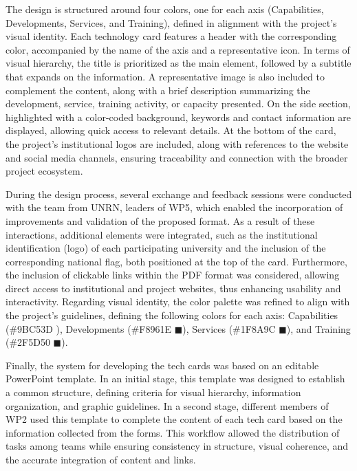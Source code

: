\documentclass[
  12pt,
  oneside]{book}
\begin{document}
The design is structured around four colors, one for each axis
(Capabilities, Developments, Services, and Training), defined in
alignment with the project's visual identity. Each technology card
features a header with the corresponding color, accompanied by the name
of the axis and a representative icon. In terms of visual hierarchy, the
title is prioritized as the main element, followed by a subtitle that
expands on the information. A representative image is also included to
complement the content, along with a brief description summarizing the
development, service, training activity, or capacity presented. On the
side section, highlighted with a color-coded background, keywords and
contact information are displayed, allowing quick access to relevant
details. At the bottom of the card, the project's institutional logos
are included, along with references to the website and social media
channels, ensuring traceability and connection with the broader project
ecosystem.

During the design process, several exchange and feedback sessions were
conducted with the team from UNRN, leaders of WP5, which enabled the
incorporation of improvements and validation of the proposed format. As
a result of these interactions, additional elements were integrated,
such as the institutional identification (logo) of each participating
university and the inclusion of the corresponding national flag, both
positioned at the top of the card. Furthermore, the inclusion of
clickable links within the PDF format was considered, allowing direct
access to institutional and project websites, thus enhancing usability
and interactivity. Regarding visual identity, the color palette was
refined to align with the project's guidelines, defining the following
colors for each axis: Capabilities (\#9BC53D
\textcolor{Verde}{\scalebox{1}{$\blacksquare$}}), Developments (\#F8961E
\textcolor{Naranja}{$\blacksquare$}), Services (\#1F8A9C
\textcolor{Celeste}{$\blacksquare$}), and Training (\#2F5D50
\textcolor{Verde_osc}{$\blacksquare$}).

Finally, the system for developing the tech cards was based on an
editable PowerPoint template. In an initial stage, this template was
designed to establish a common structure, defining criteria for visual
hierarchy, information organization, and graphic guidelines. In a second
stage, different members of WP2 used this template to complete the
content of each tech card based on the information collected from the
forms. This workflow allowed the distribution of tasks among teams while
ensuring consistency in structure, visual coherence, and the accurate
integration of content and links.
\end{document}
